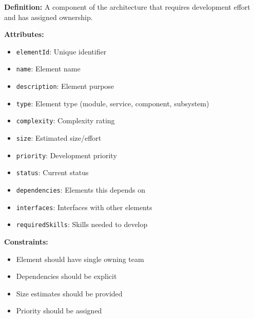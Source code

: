 \documentclass[11pt,letterpaper]{article}
\begin{document}
\begin{definitionbox}
\textbf{Definition:} A component of the architecture that requires development effort and has assigned ownership.

\textbf{Attributes:}
\begin{itemize}[nosep]
    \item \texttt{elementId}: Unique identifier
    \item \texttt{name}: Element name
    \item \texttt{description}: Element purpose
    \item \texttt{type}: Element type (module, service, component, subsystem)
    \item \texttt{complexity}: Complexity rating
    \item \texttt{size}: Estimated size/effort
    \item \texttt{priority}: Development priority
    \item \texttt{status}: Current status
    \item \texttt{dependencies}: Elements this depends on
    \item \texttt{interfaces}: Interfaces with other elements
    \item \texttt{requiredSkills}: Skills needed to develop
\end{itemize}

\textbf{Constraints:}
\begin{itemize}[nosep]
    \item Element should have single owning team
    \item Dependencies should be explicit
    \item Size estimates should be provided
    \item Priority should be assigned
\end{itemize}
\end{definitionbox}
\end{document}

